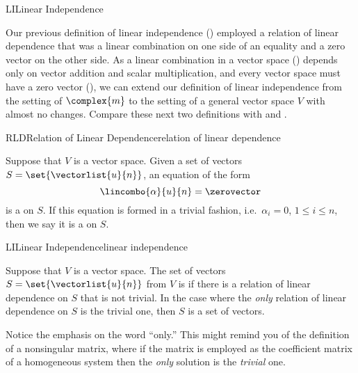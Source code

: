 \begin{subsect}{LI}{Linear Independence}
%
\begin{para}Our previous definition of linear independence () employed a relation of linear dependence that was a linear combination on one side of an equality and a zero vector on the other side.  As a linear combination in a vector space () depends only on vector addition and scalar multiplication, and every vector space must have a zero vector (), we can extend our definition of linear independence from the setting of $\complex{m}$ to the setting of a general vector space $V$ with almost no changes.  Compare these next two definitions with  and .\end{para}
%
\begin{definition}{RLD}{Relation of Linear Dependence}{relation of linear dependence}
\begin{para}Suppose that $V$ is a vector space.
Given a set of vectors $S=\set{\vectorlist{u}{n}}$, an equation of the form
%
\begin{equation*}
\lincombo{\alpha}{u}{n}=\zerovector
\end{equation*}
%
is a  on $S$.  If this equation is formed in a trivial fashion, i.e.\ $\alpha_i=0$, $1\leq i\leq n$, then we say it is a  on $S$.
\end{para}
%
\end{definition}
%
\begin{definition}{LI}{Linear Independence}{linear independence}
\begin{para}Suppose that $V$ is a vector space.
The set of vectors $S=\set{\vectorlist{u}{n}}$ from $V$ is  if there is a relation of linear dependence on $S$ that is not trivial.  In the case where the {\em only} relation of linear dependence on $S$ is the trivial one, then $S$ is a  set of vectors.\end{para}
\end{definition}
%
\begin{para}Notice the emphasis on the word ``only.''  This might remind you of the definition of a nonsingular matrix, where if the matrix is employed as the coefficient matrix of a homogeneous system then the {\em only} solution is the {\em trivial} one.\end{para}
%

\end{subsect}
